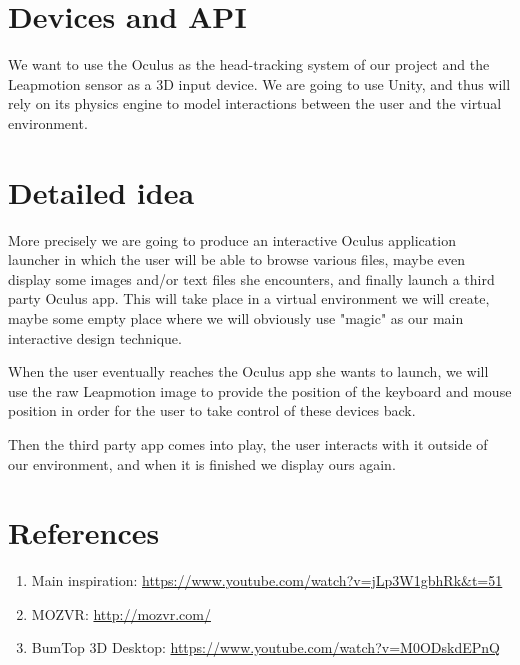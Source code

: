 \documentclass[paper=a4, fontsize=11pt]{scrartcl} %
\numberwithin{equation}{section} %
\numberwithin{figure}{section} %
\numberwithin{table}{section} %
\begin{document}

\section{Devices and API}
We want to use the Oculus as the head-tracking system of our project and the Leapmotion sensor as a 3D input device. We are going to use Unity, and thus will rely on its physics engine to model interactions between the user and the virtual environment.


\section{Detailed idea}
More precisely we are going to produce an interactive Oculus application launcher in which the user will be able to browse various files, maybe even display some images and/or text files she encounters, and finally launch a third party Oculus app. This will take place in a virtual environment we will create, maybe some empty place where we will obviously use "magic" as our main interactive design technique.

When the user eventually reaches the Oculus app she wants to launch, we will use the raw Leapmotion image to provide the position of the keyboard and mouse position in order for the user to take control of these devices back. 

Then the third party app comes into play, the user interacts with it outside of our environment, and when it is finished we display ours again.


\section{References}
\label{sec:refs}
\begin{enumerate}
\item Main inspiration: \url{https://www.youtube.com/watch?v=jLp3W1gbhRk&t=51}
\item MOZVR: \url{http://mozvr.com/}
\item BumTop 3D Desktop: \url{https://www.youtube.com/watch?v=M0ODskdEPnQ}
\end{enumerate}
\end{document}
